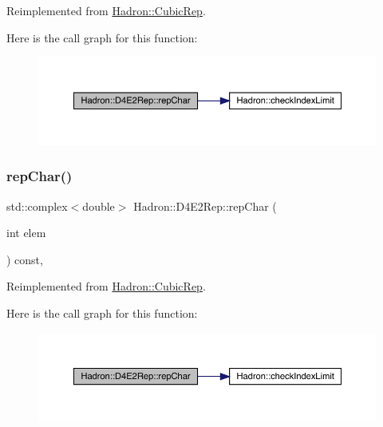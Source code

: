 Reimplemented from \mbox{\hyperlink{structHadron_1_1CubicRep_af45227106e8e715e84b0af69cd3b36f8}{Hadron\+::\+Cubic\+Rep}}.

Here is the call graph for this function\+:
\nopagebreak
\begin{figure}[H]
\begin{center}
\leavevmode
\includegraphics[width=350pt]{d5/da6/structHadron_1_1D4E2Rep_a5f1abc30578bd5d20e32ca5676a86c84_cgraph}
\end{center}
\end{figure}
\mbox{\label{structHadron_1_1D4E2Rep_a5f1abc30578bd5d20e32ca5676a86c84}} 
\subsubsection{\texorpdfstring{repChar()}{repChar()}\hspace{0.1cm}{\footnotesize\ttfamily [3/3]}}
{\footnotesize\ttfamily std\+::complex$<$double$>$ Hadron\+::\+D4\+E2\+Rep\+::rep\+Char (\begin{DoxyParamCaption}\item[{int}]{elem }\end{DoxyParamCaption}) const\hspace{0.3cm}{\ttfamily [inline]}, {\ttfamily [virtual]}}



Reimplemented from \mbox{\hyperlink{structHadron_1_1CubicRep_af45227106e8e715e84b0af69cd3b36f8}{Hadron\+::\+Cubic\+Rep}}.

Here is the call graph for this function\+:
\nopagebreak
\begin{figure}[H]
\begin{center}
\leavevmode
\includegraphics[width=350pt]{d5/da6/structHadron_1_1D4E2Rep_a5f1abc30578bd5d20e32ca5676a86c84_cgraph}
\end{center}
\end{figure}
\mbox{\label{structHadron_1_1D4E2Rep_ae07926c0c41e03ed930683eb4e9be5f5}} 

